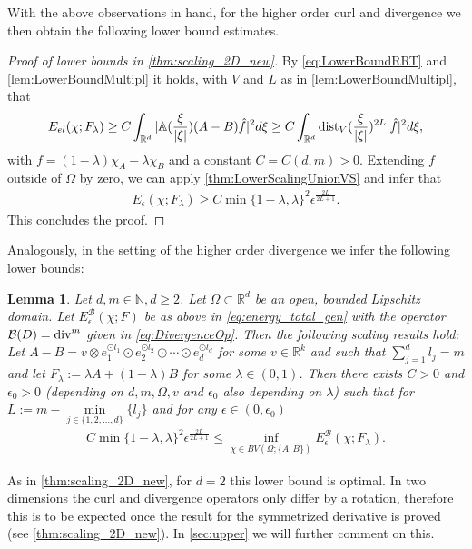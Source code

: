 \documentclass[a4paper, 10pt, twoside, notitlepage]{amsart}
\theoremstyle{plain}
\newtheorem{lem}[prop]{Lemma}
\newcommand{\R}{\mathbb{R}}
\newcommand{\N}{\mathbb{N}}
\newcommand{\B}{\mathcal{B}}
\renewcommand{\AA}{\mathbb{A}}
\begin{document}
		
		
		
		
		With the above observations in hand, for the higher order curl and divergence we then obtain the following lower bound estimates.
		
		
		
		
                
			\begin{proof}[Proof of lower bounds in \cref{thm:scaling_2D_new}]
				By \eqref{eq:LowerBoundRRT} and \cref{lem:LowerBoundMultipl} it holds, with $V$ and $L$ as in \cref{lem:LowerBoundMultipl}, that
				\begin{align*}
					E_{el}(\chi;F_\lambda) \geq C \int_{\R^d} |\AA(\frac{\xi}{|\xi|})(A-B) \hat{f}|^2 d\xi \geq C \int_{\R^d} \dist_V(\frac{\xi}{|\xi|})^{2L} |\hat{f}|^2 d\xi,
				\end{align*}
				with $f = (1-\lambda)\chi_A-\lambda\chi_B$ and a constant $C = C(d,m)>0$.  Extending $f$ outside of $\Omega$ by zero, we can apply \cref{thm:LowerScalingUnionVS} and infer that
				\begin{align*}
					E_{\epsilon}(\chi;F_\lambda) \geq C\min\{1-\lambda,\lambda\}^2 \epsilon^{\frac{2L}{2L+1}}.
				\end{align*}
				This concludes the proof.
			\end{proof}
		
		
		Analogously, in the setting of the higher order divergence we infer the following lower bounds:
		
                            
             \begin{lem}
            \label{lem:LowerScalingDiv}
		Let $d,m \in \N, d \geq 2$. Let $\Omega \subset \R^d$ be an open, bounded Lipschitz domain. Let $E_{\epsilon}^{\mathcal{B}}(\chi;F)$ be as above in \eqref{eq:energy_total_gen}  with the operator $\B(D) = \di^m$ given in \eqref{eq:DivergenceOp}. Then the following scaling results hold:
                Let $A-B = v \otimes e_1^{\odot l_1} \odot e_2^{\odot l_2} \odot \cdots \odot e_d^{\odot l_d}$ for some $v \in \R^k$ and such
			that $\sum_{j = 1}^{d} l_{j} = m$ and let $F_{\lambda}:= \lambda A + (1-\lambda ) B$ for some $\lambda \in (0,1)$. Then there exists $C>0$ and $\epsilon_0>0$ (depending on $d, m, \Omega, v$ and $\epsilon_0$ also depending on $\lambda$) such
			that for $L:=m -\min\limits_{j\in\{1,2,\dots,d\}}\{l_j\}$ and for any $\epsilon \in (0,\epsilon_0)$
			\begin{align*}
				C \min\{1-\lambda,\lambda\}^2 \epsilon^{\frac{2L}{2L+1}} \leq \inf\limits_{\chi \in BV(\Omega;\{A,B\})} E_{\epsilon}^{\mathcal{B}}(\chi; F_{\lambda}) .
			\end{align*}
                      \end{lem}
                    As in \cref{thm:scaling_2D_new}, for $d = 2$ this lower bound is optimal. In two dimensions the curl and divergence operators only differ by a rotation, therefore this is to be expected once the result for the symmetrized derivative is proved (see \cref{thm:scaling_2D_new}). In \cref{sec:upper} we will further comment on this.
                    
\end{document}
